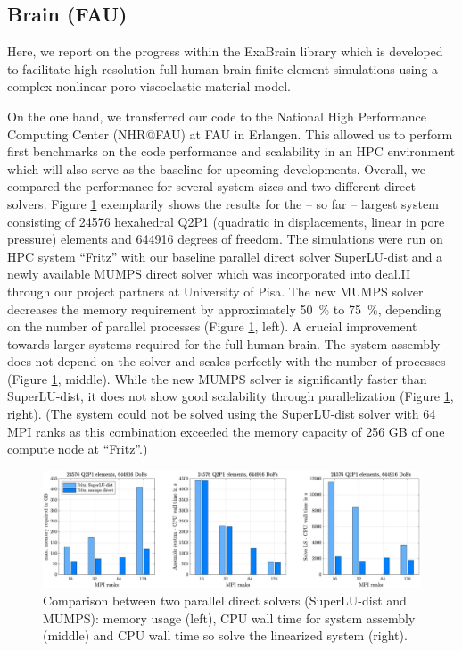 \documentclass[a4paper,12pt]{article}
\begin{document}
\subsection{Brain (FAU)}

Here, we report on the progress within the ExaBrain library which is developed to facilitate high resolution full human brain finite element simulations using a complex nonlinear poro-viscoelastic material model.

On the one hand, we transferred our code to the National High Performance Computing Center (NHR@FAU) at FAU in Erlangen. This allowed us to perform first benchmarks on the code performance and scalability in an HPC environment which will also serve as the baseline for upcoming developments. Overall, we compared the performance for several system sizes and two different direct solvers. Figure \ref{fig:fau-solver-performance} exemplarily shows the results for the -- so far -- largest system consisting of 24576 hexahedral Q2P1 (quadratic in displacements, linear in pore pressure) elements and 644916 degrees of freedom. The simulations were run on HPC system ``Fritz'' with our baseline parallel direct solver SuperLU-dist and a newly available MUMPS direct solver which was incorporated into deal.II through our project partners at University of Pisa. The new MUMPS solver decreases the memory requirement by approximately \SI{50}{\percent} to \SI{75}{\percent}, depending on the number of parallel processes (Figure \ref{fig:fau-solver-performance}, left). A crucial improvement towards larger systems required for the full human brain. The system assembly does not depend on the solver and scales perfectly with the number of processes (Figure \ref{fig:fau-solver-performance}, middle). While the new MUMPS solver is significantly faster than SuperLU-dist, it does not show good scalability through parallelization (Figure \ref{fig:fau-solver-performance}, right). (The system could not be solved using the SuperLU-dist solver with 64 MPI ranks as this combination exceeded the memory capacity of 256 GB of one compute node at ``Fritz''.)

\begin{figure}
  \centering

  \includegraphics[width=\textwidth]{fau-solver-performance.jpg}

  \caption{Comparison between two parallel direct solvers (SuperLU-dist and MUMPS): memory usage (left), CPU wall time for system assembly (middle) and CPU wall time so solve the linearized system (right).}
  \label{fig:fau-solver-performance}
\end{figure}
\end{document}
